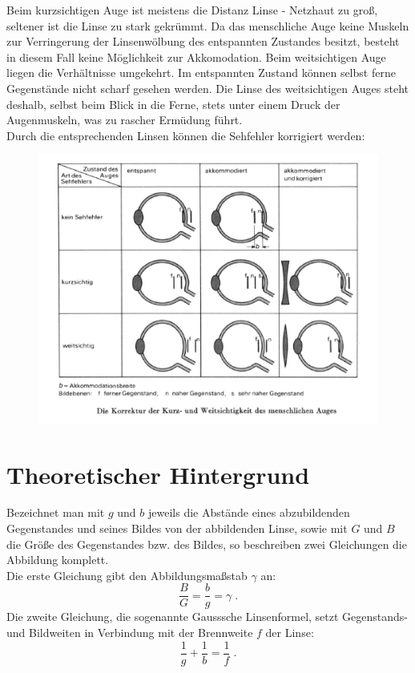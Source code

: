 \noindent
Beim kurzsichtigen Auge ist meistens die Distanz Linse - Netzhaut zu groß, seltener ist die Linse zu stark gekrümmt. Da das menschliche Auge keine Muskeln zur Verringerung der Linsenwölbung des entspannten Zustandes besitzt, besteht in diesem Fall keine Möglichkeit zur Akkomodation. Beim weitsichtigen Auge liegen die Verhältnisse umgekehrt. Im entspannten Zustand können selbst ferne Gegenstände nicht scharf gesehen werden. Die Linse des weitsichtigen Auges steht deshalb, selbst beim Blick in die Ferne, stets unter einem Druck der Augenmuskeln, was zu rascher Ermüdung führt.\\

\noindent
Durch die entsprechenden Linsen können die Sehfehler korrigiert werden:
\begin{figure}[h]
	\centering
		\includegraphics[width=\textwidth]{Abbildungen/Sehfehler.jpg}
	\label{fig:Sehfehler}
\end{figure}

\section{Theoretischer Hintergrund}

Bezeichnet man mit $g$ und $b$ jeweils die Abstände eines abzubildenden Gegenstandes und seines Bildes von der abbildenden Linse, sowie mit $G$ und $B$ die Größe des Gegenstandes bzw. des Bildes, so beschreiben zwei Gleichungen die Abbildung komplett.\\
Die erste Gleichung gibt den Abbildungsmaßstab $\gamma$ an:
\begin{equation} \label{eq:Abbildungsmassstab-Linse}
 \frac{B}{G} = \frac{b}{g} = \gamma\; .
\end{equation}
Die zweite Gleichung, die sogenannte Gausssche Linsenformel, setzt Gegenstands- und Bildweiten in Verbindung mit der Brennweite $f$ der Linse:
\begin{equation} \label{eq:Linsenformel}
 \frac{1}{g} + \frac{1}{b} = \frac{1}{f}\; .
\end{equation}


